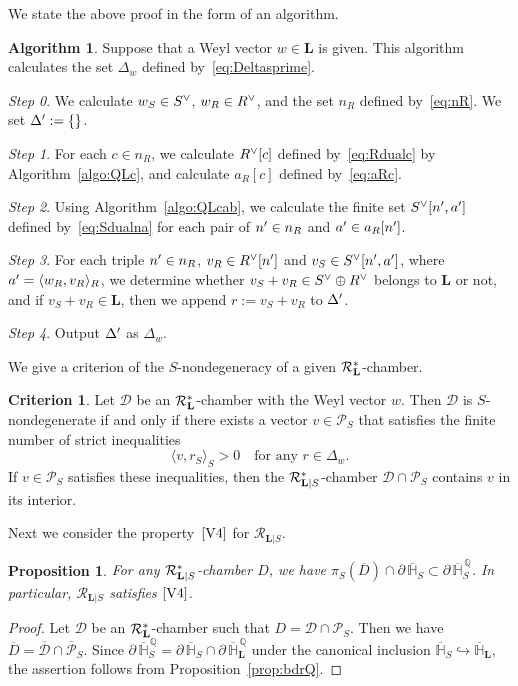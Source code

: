 \documentclass{amsart}
\theoremstyle{plain}
\newtheorem{proposition}[theorem]{Proposition}
\theoremstyle{definition}
\newtheorem{algorithm}[theorem]{Algorithm}
\newtheorem{criterion}[theorem]{Criterion}
\theoremstyle{remark}
\numberwithin{equation}{section}
\numberwithin{table}{section}
\numberwithin{figure}{section}
\newcommand{\step}[1]{{\it Step #1}}
\renewcommand{\H}{\mathord{\mathbb H}}
\newcommand{\Q}{\mathord{\mathbb  Q}}
\newcommand{\DDD}{\mathord{\mathcal D}}
\newcommand{\PPP}{\mathord{\mathcal P}}
\newcommand{\RRR}{\mathord{\mathcal R}}
\newcommand{\inj}{\hookrightarrow}
\newcommand{\sprime}{\sp\prime}
\newcommand{\dual}{\sp{\vee}}
\newcommand{\bdr}{\partial\,}
\newcommand{\closure}[1]{\overline{#1}}
\renewcommand{\L}{\mathord{\mathbf{L}}}
\newcommand{\intM}[2]{\langle{#1}\rangle_{#2}}
\newcommand{\Roots}{\RRR}
\newcommand{\sphyp}{\sp*}
\newcommand{\clPPP}{\overline{\PPP}}
\newcommand{\clH}{\overline{\H}}
\newcommand{\clD}{\overline{D}}
\newcommand{\bdrclH}{\bdr\clH}
\newcommand{\bdrclHQ}{\bdr\clH^{\,\Q}}
\newcommand{\RtsLS}{\Roots_{\L|S}}
\newcommand{\propVfour}{\mathord{\rm [V4]}}
\begin{document}
%
We state the above proof in the form of an algorithm.
%
\begin{algorithm}\label{algorithm:Deltaw}
Suppose that a Weyl vector $w\in \L$  is given.
This algorithm calculates the set $\Delta_{w}$
defined by~\eqref{eq:Deltasprime}.
\par
\step{0}.
We calculate $w_S\in S\dual$, $w_R\in R\dual$,
and the set $n_R$ defined by~\eqref{eq:nR}.
We set $\Delta\sprime:=\{\}$.
\par
\step{1}.
For each $c\in n_R$, we calculate 
$R\dual[c]$ defined by~\eqref{eq:Rdualc} by  Algorithm~\ref{algo:QLc},
and calculate $a_R[c]$ defined by~\eqref{eq:aRc}.
\par
\step{2}.
Using Algorithm~\ref{algo:QLcab},
we calculate the finite set 
$S\dual[n\sprime, a\sprime]$
defined by~\eqref{eq:Sdualna}
for each pair of $n\sprime\in n_R$ and $a\sprime\in a_R[n\sprime]$.
\par
\step{3}.
For each triple 
$n\sprime\in n_R$, $v_R\in R\dual[n\sprime]$
and $v_S\in S\dual[n\sprime, a\sprime]$,  where $a\sprime=\intM{w_R, v_R}{R}$,
we determine whether $v_S+v_R \in S\dual\oplus R\dual$ belongs to  ${\L}$ or not,
and if $v_S+v_R\in {\L}$,
then we append $r:=v_S+v_R$ to $\Delta\sprime$.
\par
\step{4}.
Output $\Delta\sprime$ as $\Delta_w$.
\end{algorithm}
%
We give a criterion of the $S$-nondegeneracy of a given $\Roots_{\L}\sphyp$-chamber.
%
\begin{criterion}\label{criterion:Snondeg}
Let $\DDD$ be an $\Roots_{\L}\sphyp$-chamber with the Weyl vector $w$.
Then $\DDD$ is $S$-nondegenerate if and only if
there exists a vector  $v\in \PPP_S$ that satisfies the finite number of strict inequalities 
%
\begin{equation}\label{eq:ineqSnondeg}
\intM{v, r_S}{S}>0\quad\textrm{for any $r\in \Delta_w$}.
\end{equation}
%
If $v\in \PPP_S$ satisfies these inequalities,
then the  $\RtsLS\sphyp$-chamber $\DDD\cap\PPP_S$ contains $v$ in its interior.
%
\end{criterion}
%
%
Next we consider the property~$\propVfour$ for $\RtsLS$.
%
%
\begin{proposition}\label{prop:proerty_d}
For any  $\RtsLS\sphyp$-chamber $D$,
we have $\pi_S(\clD)\cap\bdr\clH_S\subset \bdrclHQ_S$.
In particular, $\RtsLS$ satisfies $\propVfour$.
\end{proposition}
%
%
\begin{proof}
Let  $\DDD$ be an $\Roots_{\L}\sphyp$-chamber such that $D=\DDD\cap\PPP_S$.
Then we have $\clD =\closure{\DDD}\cap\clPPP_S$.
Since $\bdrclHQ_S=\bdrclH_S\cap\bdrclHQ_{\L}$ under the canonical inclusion  $\clH_S\inj \clH_{\L}$,
the assertion follows from Proposition~\ref{prop:bdrQ}.
\end{proof}
\end{document}
